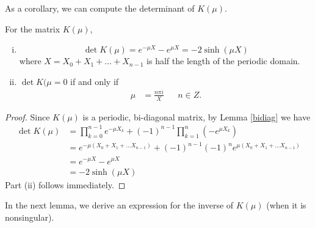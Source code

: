\documentclass[thesis.tex]{subfiles}
\begin{document}
As a corollary, we can compute the determinant of $K(\mu)$.
\begin{corollary}\label{detKcorr}
For the matrix $K(\mu)$, 
\begin{enumerate}[(i)]
\item 
\begin{equation}\label{detK}
\det K(\mu) = e^{-\mu X} - e^{\mu X} = -2 \sinh (\mu X)
\end{equation}
where $X = X_0 + X_1 + \dots + X_{n-1}$ is half the length of the periodic domain. 
\item $\det K(\mu = 0$ if and only if 
\begin{align*}
\mu &= \frac{n \pi i}{X} && n \in Z.
\end{align*} 
\end{enumerate}
\begin{proof}
Since $K(\mu)$ is a periodic, bi-diagonal matrix, by Lemma \ref{bidiag} we have
\begin{align*}
\det K(\mu) &= \prod_{k = 0}^{n-1} e^{-\mu X_k} + (-1)^{n-1} \prod_{k = 1}^n (-e^{\mu X_k}) \\
&= e^{-\mu(X_0 + X_1 + \dots X_{n-1})} + (-1)^{n-1} (-1)^n e^{\mu(X_0 + X_1 + \dots X_{n-1})} \\
&= e^{-\mu X} - e^{\mu X} \\
&= -2 \sinh (\mu X)
\end{align*}
Part (ii) follows immediately.
\end{proof}
\end{corollary}

In the next lemma, we derive an expression for the inverse of $K(\mu)$ (when it is nonsingular).
\end{document}

